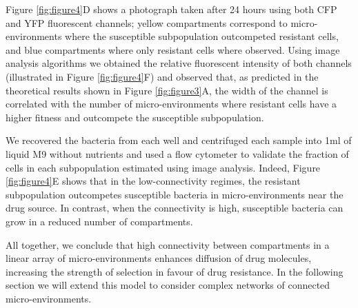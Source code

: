 \documentclass[fleqn,12pt]{wlscirep}
\begin{document}
Figure \ref{fig:figure4}D shows a photograph taken after 24 hours using both CFP and YFP fluorescent channels; yellow compartments correspond to micro-environments where the susceptible subpopulation outcompeted resistant cells, and blue compartments where only resistant cells where observed. Using image analysis algorithms we obtained the relative fluorescent intensity of both channels (illustrated in Figure \ref{fig:figure4}F) and observed that, as predicted in the theoretical results shown in Figure \ref{fig:figure3}A, the width of the channel is correlated with the number of micro-environments where resistant cells have a higher fitness and outcompete the susceptible subpopulation.  

We recovered the bacteria from each well and centrifuged each sample into 1ml of liquid M9 without nutrients and used a flow cytometer to validate the fraction of cells in each subpopulation estimated using image analysis.  Indeed, Figure \ref{fig:figure4}E shows that in the low-connectivity regimes, the resistant subpopulation outcompetes susceptible bacteria in micro-environments near the drug source.  In contrast, when the connectivity is high, susceptible bacteria can grow in a reduced number of compartments.  

All together, we conclude that high connectivity between compartments in a linear array of micro-environments enhances diffusion of drug molecules, increasing the strength of selection in favour of drug resistance.  In the following section we will extend this model to consider complex networks of connected micro-environments.

\end{document}
